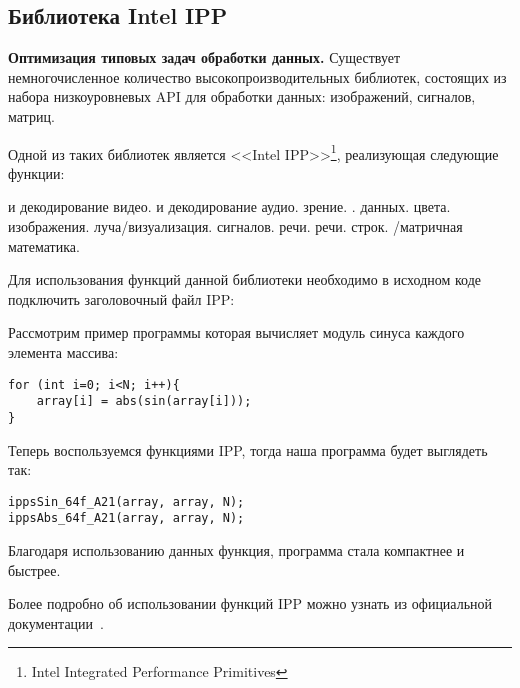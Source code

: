 \subsection{Библиотека Intel IPP}
\label{IPP:section}

\textbf{Оптимизация типовых задач обработки данных.} Существует немногочисленное количество высокопроизводительных библиотек, состоящих из набора низкоуровневых API для обработки данных: изображений, сигналов, матриц.

Одной из таких библиотек является <<Intel IPP>>\footnote{Intel Integrated Performance Primitives}, реализующая следующие функции:
\begin{itemize}
     и декодирование видео.
     и декодирование аудио.
     зрение.
    .
     данных.
     цвета.
     изображения.
     луча/визуализация.
     сигналов.
     речи.
     речи.
     строк.
    /матричная математика.
\end{itemize}

Для использования функций данной библиотеки необходимо в исходном коде подключить заголовочный файл IPP: 

Рассмотрим пример программы которая вычисляет модуль синуса каждого элемента массива:

\begin{verbatim}
for (int i=0; i<N; i++){
    array[i] = abs(sin(array[i]));
}
\end{verbatim}

Теперь воспользуемся функциями IPP, тогда наша программа будет выглядеть так:

\begin{verbatim}
ippsSin_64f_A21(array, array, N);
ippsAbs_64f_A21(array, array, N);
\end{verbatim}

Благодаря использованию данных функция, программа стала компактнее и быстрее.

Более подробно об использовании функций IPP можно узнать из официальной документации~\cite{IppPrimitives}.

